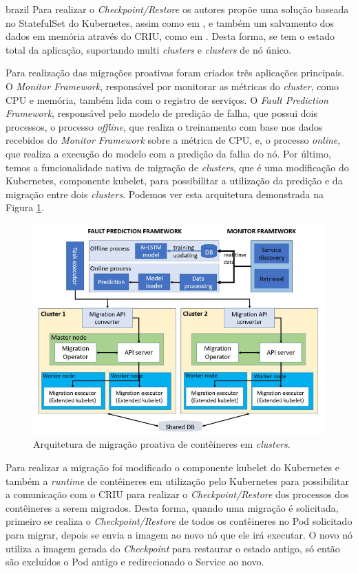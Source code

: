 \begin{otherlanguage*}{brazil}
Para realizar o \textit{Checkpoint/Restore} os autores propõe uma solução
baseada no StatefulSet do Kubernetes, assim como em \cite{vayghan2021kubernetes},
e também um salvamento dos dados em memória através do CRIU, como em
\cite{muller2022architecture}. Desta forma, se tem o estado total da aplicação,
suportando multi \textit{clusters} e \textit{clusters} de nó único.

Para realização das migrações proativas foram criados três aplicações
principais. O \textit{Monitor Framework}, responsável por monitorar as métricas
do \textit{cluster}, como CPU e memória, também lida com o registro de serviços.
O \textit{Fault Prediction Framework}, responsável pelo modelo de predição
de falha, que possui dois processos, o processo \textit{offline}, que realiza
o treinamento com base nos dados recebidos do \textit{Monitor Framework} sobre
a métrica de CPU, e, o processo \textit{online}, que realiza a execução do
modelo com a predição da falha do nó. Por último, temos a funcionalidade
nativa de migração de \textit{clusters}, que é uma modificação do Kubernetes,
componente kubelet, para possibilitar a utilização da predição e da migração
entre dois \textit{clusters}. Podemos ver esta arquitetura demonstrada na
Figura \ref{fig:proactive}.

\begin{figure}[h]
\centering
\includegraphics[scale=0.54]{images/proactive-architecture.png}
\caption{Arquitetura de migração proativa de contêineres em \textit{clusters}.}
\label{fig:proactive}
\end{figure}


Para realizar a migração foi modificado o componente kubelet do Kubernetes e
também a \textit{runtime} de contêineres em utilização pelo Kubernetes para
possibilitar a comunicação com o CRIU para realizar o \textit{Checkpoint/Restore}
dos processos dos contêineres a serem migrados. Desta forma, quando uma migração
é solicitada, primeiro se realiza o \textit{Checkpoint/Restore} de todos os
contêineres no Pod solicitado para migrar, depois se envia a imagem ao novo nó
que ele irá executar. O novo nó utiliza a imagem gerada do \textit{Checkpoint}
para restaurar o estado antigo, só então são excluídos o Pod antigo e
redirecionado o Service ao novo.


\end{otherlanguage*}
